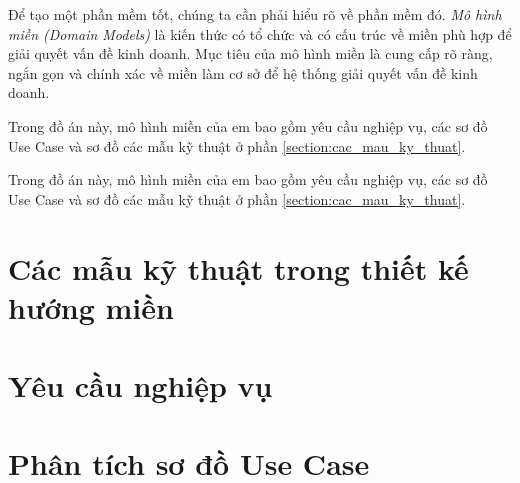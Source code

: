 

Để tạo một phần mềm tốt, chúng ta cần phải hiểu rõ về phần mềm đó. \emph{Mô hình miền (Domain Models)} là kiến thức có tổ chức và có cấu trúc về miền phù hợp để giải quyết vấn đề kinh doanh. Mục tiêu của mô hình miền là cung cấp rõ ràng, ngắn gọn và chính xác về miền làm cơ sở để hệ thống giải quyết vấn đề kinh doanh.

\begin{example} Trong đồ án này, mô hình miền của em bao gồm yêu cầu nghiệp vụ, các sơ đồ Use Case và sơ đồ các mẫu kỹ thuật ở phần \ref{section:cac_mau_ky_thuat}. \end{example}
\begin{example} Trong đồ án này, mô hình miền của em bao gồm yêu cầu nghiệp vụ, các sơ đồ Use Case và sơ đồ các mẫu kỹ thuật ở phần \ref{section:cac_mau_ky_thuat}. \end{example}





\section{Các mẫu kỹ thuật trong thiết kế hướng miền} 
\section{Yêu cầu nghiệp vụ} 
\section{Phân tích sơ đồ Use Case} 